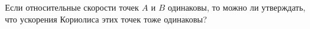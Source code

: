 Если относительные скорости точек $A$ и $B$ одинаковы, то можно ли
утверждать, что ускорения Кориолиса этих точек тоже одинаковы?
